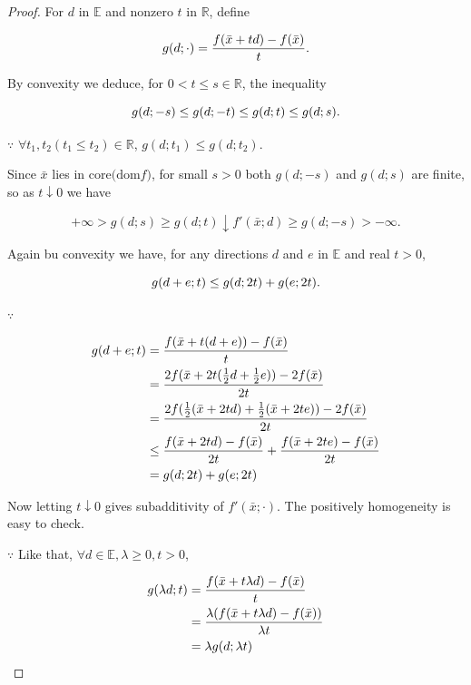 \documentclass[a4paper,11pt]{jsarticle}
\begin{document}
\begin{proof}
  For $d$ in $\mathbb{E}$ and nonzero $t$ in $\mathbb{R}$, define

  \begin{equation}
    g(d; \cdot) = \frac{f(\bar{x}+td) - f(\bar{x})}{t}. \notag
  \end{equation}

  By convexity we deduce, for $0<t\leq s \in \mathbb{R}$, the inequality

  \begin{equation}
    g(d;-s) \leq g(d;-t) \leq g(d;t) \leq g(d;s). \notag
  \end{equation}

  $\because$ $\forall t_1,t_2 (t_1 \leq t_2) \in \mathbb{R}$, $g(d;t_1) \leq g(d;t_2)$.

  Since $\bar{x}$ lies in $\text{core($\text{dom}f$)}$, for small $s > 0$ both $g(d;-s)$ and $g(d;s)$ are finite, so as $t\downarrow 0$ we have

  \begin{equation}
    +\infty > g(d;s) \geq g(d;t) \downarrow f'(\bar{x};d) \geq g(d; -s) > -\infty.
  \end{equation}

  Again bu convexity we have, for any directions $d$ and $e$ in $\mathbb{E}$ and real $t>0$,

  \begin{equation}
    g(d+e;t) \leq g(d;2t) + g(e;2t). \notag
  \end{equation}

  $\because$

  \begin{equation}
    \begin{split}
      g(d+e;t) &= \frac{f(\bar{x}+t(d+e))-f(\bar{x})}{t}\\
      &= \frac{2f(\bar{x}+2t(\frac{1}{2}d+\frac{1}{2}e))-2f(\bar{x})}{2t}\\
      &= \frac{2f(\frac{1}{2}(\bar{x}+2td)+\frac{1}{2}(\bar{x}+2te))-2f(\bar{x})}{2t}\\
      &\leq \frac{f(\bar{x}+2td)-f(\bar{x})}{2t} + \frac{f(\bar{x}+2te)-f(\bar{x})}{2t}\\
      &= g(d;2t) + g(e;2t) \notag
    \end{split}
  \end{equation}

  Now letting $t \downarrow 0$ gives subadditivity of $f'(\bar{x};\cdot)$. The positively homogeneity is easy to check.

  $\because$ Like that, $\forall d \in \mathbb{E},\lambda \geq 0, t>0$,

  \begin{equation}
    \begin{split}
      g(\lambda d;t) &= \frac{f(\bar{x}+t\lambda d) - f(\bar{x})}{t}\\
      &= \frac{\lambda (f(\bar{x}+t\lambda d) - f(\bar{x}))}{\lambda t}\\
      &= \lambda g(d;\lambda t) \notag
    \end{split}
  \end{equation}
\end{proof}
\end{document}
